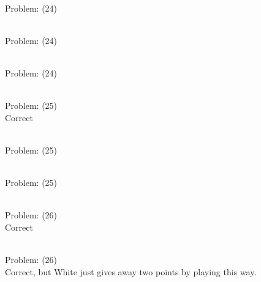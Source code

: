 \documentclass[11pt]{article}
\begin{document}
\begin{minipage}[t]{0.5\textwidth}
  {\centering
  
\\
Problem: (24)\\
  }
\end{minipage}
\begin{minipage}[t]{0.5\textwidth}
  {\centering
  
\\
Problem: (24)\\
  }
\end{minipage}
\begin{minipage}[t]{0.5\textwidth}
  {\centering
  
\\
Problem: (24)\\
  }
\end{minipage}
\begin{minipage}[t]{0.5\textwidth}
  {\centering
  
\\
Problem: (25)\\
Correct\\
  }
\end{minipage}
\begin{minipage}[t]{0.5\textwidth}
  {\centering
  
\\
Problem: (25)\\
  }
\end{minipage}
\begin{minipage}[t]{0.5\textwidth}
  {\centering
  
\\
Problem: (25)\\
  }
\end{minipage}
\begin{minipage}[t]{0.5\textwidth}
  {\centering
  
\\
Problem: (26)\\
Correct\\
  }
\end{minipage}
\begin{minipage}[t]{0.5\textwidth}
  {\centering
  
\\
Problem: (26)\\
Correct, but White just gives away two points by playing this way.\\
  }
\end{minipage}
\end{document}

